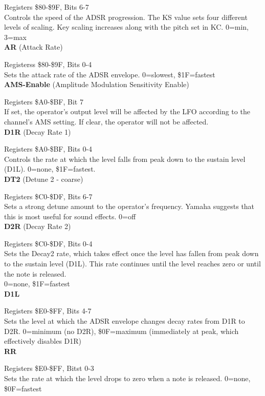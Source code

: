 Registers \$80-\$9F, Bits 6-7\\

Controls the speed of the ADSR progression. The KS value sets four different
levels of scaling. Key scaling increases along with the pitch set in KC. 0=min,
3=max\\

{\bfseries AR} (Attack Rate)

Registerss \$80-\$9F, Bits 0-4\\

Sets the attack rate of the ADSR envelope. 0=slowest, \$1F=fastest\\

{\bfseries AMS-Enable} (Amplitude Modulation Sensitivity Enable)

Registers \$A0-\$BF, Bit 7\\

If set, the operator's output level will be affected by the LFO according to
the channel's AMS setting. If clear, the operator will not be affected.\\

{\bfseries D1R} (Decay Rate 1)

Registers \$A0-\$BF, Bits 0-4\\

Controls the rate at which the level falls from peak down to the sustain level
(D1L). 0=none, \$1F=fastest.\\

{\bfseries DT2} (Detune 2 - coarse)

Registers \$C0-\$DF, Bits 6-7\\

Sets a strong detune amount to the operator's frequency. Yamaha suggests that
this is most useful for sound effects. 0=off\\

{\bfseries D2R} (Decay Rate 2)

Registers \$C0-\$DF, Bits 0-4\\

Sets the Decay2 rate, which takes effect once the level has fallen from peak
down to the sustain level (D1L). This rate continues until the level reaches
zero or until the note is released.\\

0=none, \$1F=fastest\\

{\bfseries D1L}

Registers \$E0-\$FF, Bits 4-7\\

Sets the level at which the ADSR envelope changes decay rates from D1R to D2R.
0=minimum (no D2R), \$0F=maximum (immediately at peak, which effectively
disables D1R)\\

{\bfseries RR}

Registers \$E0-\$FF, Bitst 0-3\\

Sets the rate at which the level drops to zero when a note is released. 0=none,
\$0F=fastest
